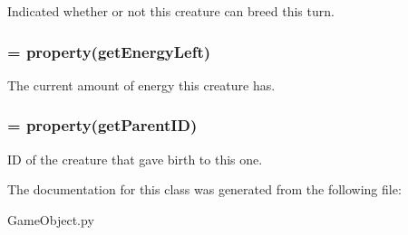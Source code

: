 \-Indicated whether or not this creature can breed this turn. 

\hypertarget{classGameObject_1_1Creature_ace5b2a169011315af356ac45e836dce7}{
\subsubsection[{energy\-Left}]{ = property(get\-Energy\-Left)}}\label{classGameObject_1_1Creature_ace5b2a169011315af356ac45e836dce7}


\-The current amount of energy this creature has. 

\hypertarget{classGameObject_1_1Creature_a284a7ea1861a216418941cb297ca4755}{
\subsubsection[{parent\-I\-D}]{ = property(get\-Parent\-I\-D)}}\label{classGameObject_1_1Creature_a284a7ea1861a216418941cb297ca4755}


\-I\-D of the creature that gave birth to this one. 



\-The documentation for this class was generated from the following file\-:\begin{DoxyCompactItemize}
\item 
\-Game\-Object.\-py\end{DoxyCompactItemize}
